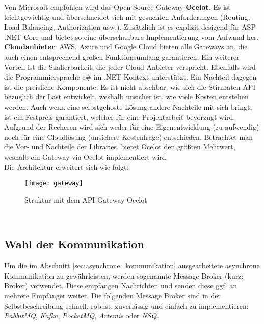 {Von Microsoft empfohlen wird das Open Source Gateway \textbf{Ocelot}. Es ist leichtgewichtig und überschneidet sich mit gesuchten Anforderungen (Routing, Load Balancing, Authorization usw.). Zusätzlich ist es explizit desigend für ASP .NET Core und bietet so eine überschaubare Implementierung vom Aufwand her.\cite{microsoftOcelot}\\

\textbf{Cloudanbieter}: AWS, Azure und Google Cloud bieten alle Gateways an, die auch einen entsprechend großen Funktionsumfang garantieren. Ein weiterer Vorteil ist die Skalierbarkeit, die jeder Cloud-Anbieter verspricht. Ebenfalls wird die Programmiersprache c\# im .NET Kontext unterstützt.\cite{GoogleCloudEndpointsDotNet}\cite{AWSDotNet} Ein Nachteil dagegen ist die preisliche Komponente. Es ist nicht absehbar, wie sich die Stirnraten API bezüglich der Last entwickelt, weshalb unsicher ist, wie viele Kosten entstehen werden. Auch wenn eine selbstgehoste Lösung andere Nachteile mit sich bringt, ist ein Festpreis garantiert, welcher für eine Projektarbeit bevorzugt wird. \\

Aufgrund der Recheren wird sich weder für eine Eigenentwicklung (zu aufwendig) noch für eine Cloudlösung (unsichere Kostenfrage) entschieden. Betrachtet man die Vor- und Nachteile der Libraries, bietet Ocelot den größten Mehrwert, weshalb ein Gateway via Ocelot implementiert wird.\\

Die Architektur erweitert sich wie folgt: 
\begin{figure}[ht]
	\centering
	\texttt{[image: gateway]}
	\caption[API Gateway mit Ocelot] {Struktur mit dem API Gateway Ocelot}
	\label{fig:gateway}
\end{figure}
\\

\subsection{Wahl der Kommunikation}

Um die im Abschnitt \ref{sec:asynchrone_kommunikation}  ausgearbeitete asynchrone Kommunikation zu gewährleisten, werden sogenannte Message Broker (kurz: Broker) verwendet. Diese empfangen Nachrichten und senden diese ggf. an mehrere Empfänger weiter. Die folgenden Message Broker sind in der Selbstbeschreibung schnell, robust, zuverlässig und einfach zu implementieren: \textit{RabbitMQ}, \textit{Kafka}, \textit{RocketMQ}, \textit{Artemis} oder \textit{NSQ}.\\

}
